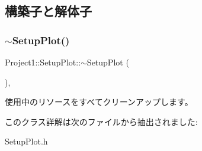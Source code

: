 \subsection{構築子と解体子}
\mbox{\label{class_project1_1_1_setup_plot_a99164cdf31bea63c1f4e01204e381538}} 
\subsubsection{\texorpdfstring{$\sim$\+Setup\+Plot()}{~SetupPlot()}}
{\footnotesize\ttfamily Project1\+::\+Setup\+Plot\+::$\sim$\+Setup\+Plot (\begin{DoxyParamCaption}{ }\end{DoxyParamCaption})\hspace{0.3cm}{\ttfamily [inline]}, {\ttfamily [protected]}}



使用中のリソースをすべてクリーンアップします。 



このクラス詳解は次のファイルから抽出されました\+:\begin{DoxyCompactItemize}
\item 
Setup\+Plot.\+h\end{DoxyCompactItemize}
